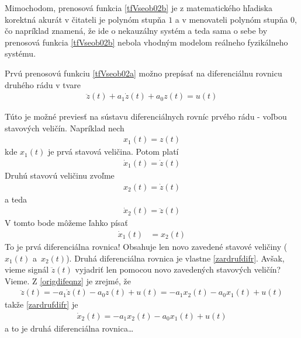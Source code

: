\documentclass[a4paper, 10pt, ]{article}
\begin{document}
Mimochodom, prenosová funkcia \eqref{tfVseob02b} je z matematického hľadiska korektná akurát v čitateli je polynóm stupňa $1$ a v menovateli polynóm stupňa $0$, čo napríklad znamená, že ide o nekauzálny systém a teda sama o sebe by prenosová funkcia \eqref{tfVseob02b} nebola vhodným modelom reálneho fyzikálneho systému.

Prvú prenosovú funkciu \eqref{tfVseob02a} možno prepísať na diferenciálnu rovnicu druhého rádu v tvare
\begin{align} \label{origdifeqnz}
	\ddot z(t) + a_1 \dot z(t) + a_0 z(t) = u(t)
\end{align}

Túto je možné previesť na sústavu diferenciálnych rovníc prvého rádu - voľbou stavových veličín. Napríklad nech
\begin{align}
	x_1(t) = z(t)
\end{align}
kde $x_1(t)$ je prvá stavová veličina. Potom platí
\begin{align}
	\dot x_1(t) = \dot z(t)
\end{align}
Druhú stavovú veličinu zvoľme
\begin{align}
	x_2(t) = \dot z(t)
\end{align}
a teda
\begin{align} \label{zardrufdifr}
	\dot x_2(t) = \ddot z(t)
\end{align}
V tomto bode môžeme ľahko písať
\begin{align}
	\dot x_1(t) &= x_2(t)
\end{align}
To je prvá diferenciálna rovnica! Obsahuje len novo zavedené stavové veličiny ($x_1(t)$ a~$x_2(t)$). Druhá diferenciálna rovnica je vlastne \eqref{zardrufdifr}. Avšak, vieme signál $\ddot z(t)$ vyjadriť len pomocou novo zavedených stavových veličín? Vieme. Z \eqref{origdifeqnz} je zrejmé, že
\begin{align}
	\ddot z(t) = - a_1 \dot z(t) - a_0 z(t) + u(t) = - a_1 x_2(t) - a_0 x_1(t) + u(t)
\end{align}
takže \eqref{zardrufdifr} je
\begin{align}
	\dot x_2(t) =  - a_1 x_2(t) - a_0 x_1(t) + u(t)
\end{align}
a to je druhá diferenciálna rovnica\ldots
\end{document}
